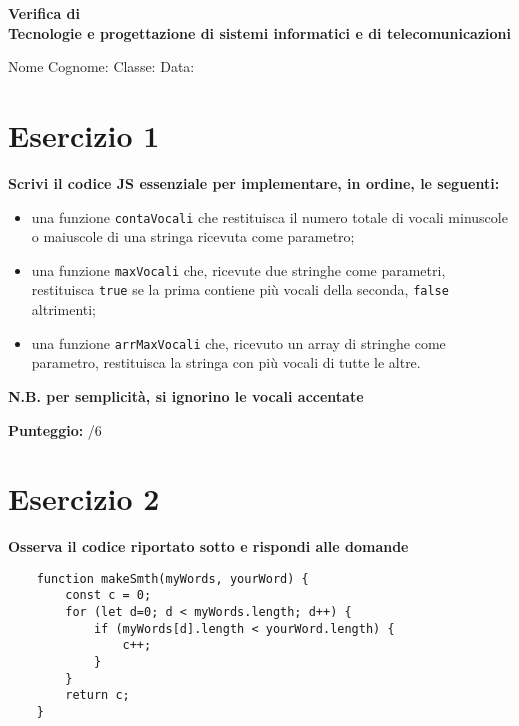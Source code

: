 \documentclass{article}
\begin{document}
\begin{center}
\textbf{\Large Verifica di \\ Tecnologie e progettazione di sistemi informatici e di telecomunicazioni}
\end{center}

\begin{flushleft}
Nome Cognome: \underline{\hspace{5cm}} \quad Classe: \underline{\hspace{3cm}} \quad Data: \underline{\hspace{3cm}}
\end{flushleft}

\section*{Esercizio 1}

\textbf{Scrivi il codice JS essenziale per implementare, in ordine, le seguenti:}

\begin{itemize}
    \item una funzione \texttt{contaVocali} che restituisca il numero totale di vocali minuscole o maiuscole di una stringa ricevuta come parametro;
    \item una funzione \texttt{maxVocali} che, ricevute due stringhe come parametri, restituisca \texttt{true} se la prima contiene più vocali della seconda, \texttt{false} altrimenti;
    \item una funzione \texttt{arrMaxVocali} che, ricevuto un array di stringhe come parametro, restituisca la stringa con più vocali di tutte le altre.
\end{itemize}

\textbf{N.B. per semplicità, si ignorino le vocali accentate}

\begin{flushright}\textbf{Punteggio:} \underline{\hspace{1cm}}/6\end{flushright}

\section*{Esercizio 2}

\textbf{Osserva il codice riportato sotto e rispondi alle domande}

\begin{lstlisting}
    function makeSmth(myWords, yourWord) {
        const c = 0;
        for (let d=0; d < myWords.length; d++) {
            if (myWords[d].length < yourWord.length) {
                c++;
            }
        }
        return c;
    }
\end{lstlisting}
\end{document}
